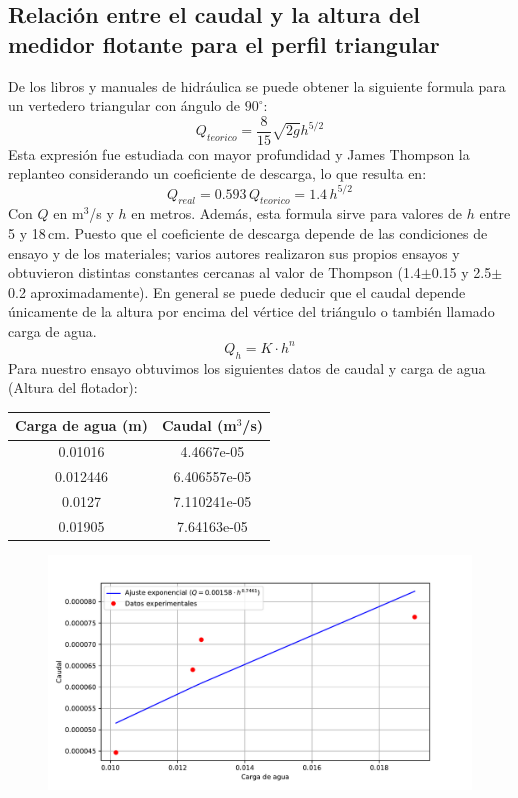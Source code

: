 \documentclass[a4paper,12pt]{report}
\begin{document}
\subsection{Relación entre el caudal y la altura del medidor flotante para el perfil triangular}
De los libros y manuales de hidráulica se puede obtener la siguiente formula para un vertedero triangular con ángulo de $90^{\circ}$:
$$
Q_{teorico} = \frac{8}{15} \sqrt{2g} h^{5/2}
$$
Esta expresión fue estudiada con mayor profundidad y James Thompson la replanteo considerando un coeficiente de descarga, lo que resulta en:
$$
Q_{real} = 0.593\,Q_{teorico} = 1.4\,h^{5/2}
$$
Con $Q$ en m$^{3}$/s y $h$ en metros. Además, esta formula sirve para valores de $h$ entre 5 y 18\,cm. Puesto que el coeficiente de descarga depende de las condiciones de ensayo y de los materiales; varios autores realizaron sus propios ensayos y obtuvieron distintas constantes cercanas al valor de Thompson (1.4$\pm$0.15 y 2.5$\pm$0.2 aproximadamente). En general se puede deducir que el caudal depende únicamente de la altura por encima del vértice del triángulo o también llamado carga de agua.
$$
Q_{h} = K\cdot h^{n}
$$
Para nuestro ensayo obtuvimos los siguientes datos de caudal y carga de agua (Altura del flotador):
\begin{center}
\begin{tabular}{|c|c|}
\hline 
Carga de agua (m)
 & Caudal (m$^{3}$/s) \\ 
\hline 
0.01016 & 4.4667e-05 \\ 
\hline 
0.012446 & 6.406557e-05 \\ 
\hline 
0.0127 &  7.110241e-05 \\ 
\hline 
0.01905 &  7.64163e-05 \\ 
\hline 
\end{tabular} 
\end{center}
\begin{figure}[H]
\centering
\includegraphics[scale=0.75]{caudalaltura.pdf}
\end{figure}
\end{document}
